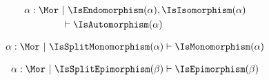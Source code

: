 \begin{sequent}
\begin{align*}
  \alpha:\Mor ~&|~  \IsEndomorphism( \alpha ), \IsIsomorphism( \alpha ) \\ 
  &\vdash \IsAutomorphism( \alpha )
\end{align*}
\end{sequent}

\begin{sequent}
\begin{align*}
  \alpha:\Mor ~|~ \IsSplitMonomorphism( \alpha ) \vdash \IsMonomorphism( \alpha )
\end{align*}
\end{sequent}

\begin{sequent}
\begin{align*}
  \alpha:\Mor ~|~ \IsSplitEpimorphism( \beta ) \vdash \IsEpimorphism( \beta )
\end{align*}
\end{sequent}